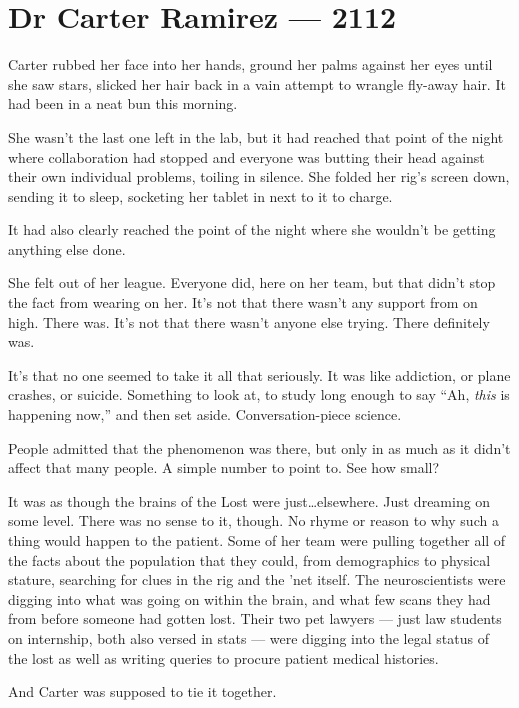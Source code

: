\hypertarget{dr-carter-ramirez-2112}{%
\chapter*{Dr Carter Ramirez — 2112}\label{dr-carter-ramirez-2112}}

Carter rubbed her face into her hands, ground her palms against her eyes until she saw stars, slicked her hair back in a vain attempt to wrangle fly-away hair. It had been in a neat bun this morning.

She wasn't the last one left in the lab, but it had reached that point of the night where collaboration had stopped and everyone was butting their head against their own individual problems, toiling in silence. She folded her rig's screen down, sending it to sleep, socketing her tablet in next to it to charge.

It had also clearly reached the point of the night where she wouldn't be getting anything else done.

She felt out of her league. Everyone did, here on her team, but that didn't stop the fact from wearing on her. It's not that there wasn't any support from on high. There was. It's not that there wasn't anyone else trying. There definitely was.

It's that no one seemed to take it all that seriously. It was like addiction, or plane crashes, or suicide. Something to look at, to study long enough to say ``Ah, \emph{this} is happening now,'' and then set aside. Conversation-piece science.

People admitted that the phenomenon was there, but only in as much as it didn't affect that many people. A simple number to point to. See how small?

It was as though the brains of the Lost were just\ldots{}elsewhere. Just dreaming on some level. There was no sense to it, though. No rhyme or reason to why such a thing would happen to the patient. Some of her team were pulling together all of the facts about the population that they could, from demographics to physical stature, searching for clues in the rig and the 'net itself. The neuroscientists were digging into what was going on within the brain, and what few scans they had from before someone had gotten lost. Their two pet lawyers — just law students on internship, both also versed in stats — were digging into the legal status of the lost as well as writing queries to procure patient medical histories.

And Carter was supposed to tie it together.

